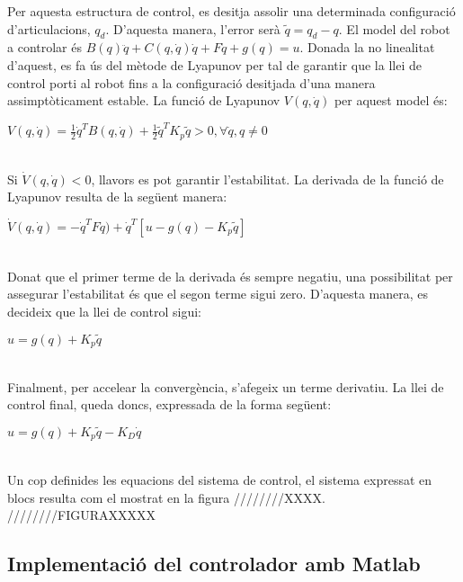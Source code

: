 \documentclass[]{article}
\begin{document}
Per aquesta estructura de control, es desitja assolir una determinada configuració d'articulacions, $q_{d}$. D'aquesta manera, l'error serà $\tilde{q} = q_{d} - q$. El model del robot a controlar és $B(q)\ddot{q} + C(q, \dot{q})\dot{q} + F\dot{q} + g(q) = u$. Donada la no linealitat d'aquest, es fa ús del mètode de Lyapunov per tal de garantir que la llei de control porti al robot fins a la configuració desitjada d'una manera assimptòticament estable. La funció de Lyapunov $V(q, \dot{q})$ per aquest model és: \\

\centerline{$V(q, \dot{q}) = \frac{1}{2}\dot{q}^TB(q,\dot{q}) +  \frac{1}{2}\tilde{q}^TK_{p}\tilde{q} > 0 , \forall\dot{q},q \neq 0$ } \leavevmode \\

Si $\dot{V}(q, \dot{q}) < 0$, llavors es pot garantir l'estabilitat. La derivada de la funció de Lyapunov resulta de la següent manera: \\

\centerline{$\dot{V}(q, \dot{q})= -\dot{q}^TF\dot{q}) + \dot{q}^T[u - g(q) - K_{p}\tilde{q}]$} \leavevmode \\

Donat que el primer terme de la derivada és sempre negatiu, una possibilitat per assegurar l'estabilitat és que el segon terme sigui zero. D'aquesta manera, es decideix que la llei de control sigui: \\

\centerline{$u = g(q) + K_{p}\tilde{q}$} \leavevmode \\

Finalment, per accelear la convergència, s'afegeix un terme derivatiu. La llei de control final, queda doncs, expressada de la forma següent: \\

\centerline{$u = g(q) + K_{p}\tilde{q} -K_{D}\dot{q}$} \leavevmode \\

Un cop definides les equacions del sistema de control, el sistema expressat en blocs resulta com el mostrat en la figura ////////XXXX. \\

////////FIGURAXXXXX 

\subsection{Implementació del controlador amb Matlab}
\end{document}
